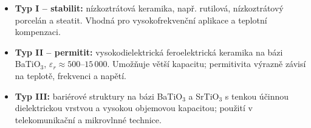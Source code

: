 \begin{itemize}
\item \textbf{Typ I -- stabilit:} nízkoztrátová keramika, např. rutilová, nízkoztrátový porcelán a steatit. Vhodná pro vysokofrekvenční aplikace a teplotní kompenzaci.
\item \textbf{Typ II -- permitit:} vysokodielektrická feroelektrická keramika na bázi BaTiO$_3$, $\varepsilon_r\approx500$--$15\,000$. Umožňuje větší kapacitu; permitivita výrazně závisí na teplotě, frekvenci a napětí.
\item \textbf{Typ III:} bariérové struktury na bázi BaTiO$_3$ a SrTiO$_3$ s tenkou účinnou dielektrickou vrstvou a vysokou objemovou kapacitou; použití v telekomunikační a mikrovlnné technice.
\end{itemize}
